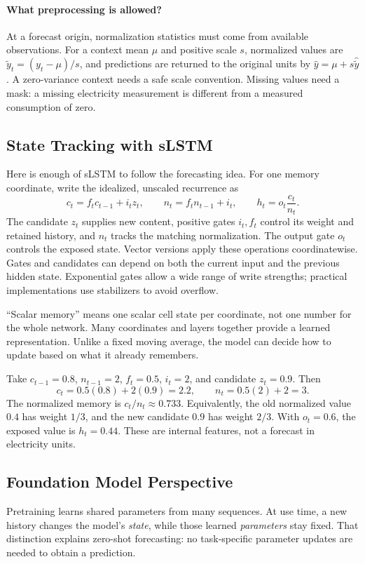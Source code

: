 \documentclass[11pt, oneside]{book}
\let\originalsubsection\subsection
\renewcommand{\subsection}{\Needspace{6\baselineskip}\originalsubsection}
\begin{document}
\paragraph{What preprocessing is allowed?} At a forecast origin, normalization statistics must come from available observations. For a context mean $\mu$ and positive scale $s$, normalized values are $\widetilde y_t=(y_t-\mu)/s$, and predictions are returned to the original units by $\widehat y=\mu+s\widehat{\widetilde y}$. A zero-variance context needs a safe scale convention. Missing values need a mask: a missing electricity measurement is different from a measured consumption of zero.

\subsection{State Tracking with sLSTM}\label{sec:source-9-1-3}
Here is enough of sLSTM to follow the forecasting idea. For one memory coordinate, write the idealized, unscaled recurrence as
\[
 c_t=f_tc_{t-1}+i_tz_t,\qquad
 n_t=f_tn_{t-1}+i_t,\qquad
 h_t=o_t\frac{c_t}{n_t}.
\]
The candidate $z_t$ supplies new content, positive gates $i_t,f_t$ control its weight and retained history, and $n_t$ tracks the matching normalization. The output gate $o_t$ controls the exposed state. Vector versions apply these operations coordinatewise. Gates and candidates can depend on both the current input and the previous hidden state. Exponential gates allow a wide range of write strengths; practical implementations use stabilizers to avoid overflow.

``Scalar memory'' means one scalar cell state per coordinate, not one number for the whole network. Many coordinates and layers together provide a learned representation. Unlike a fixed moving average, the model can decide how to update based on what it already remembers.

\begin{exbox}[title={A normalized memory update}]
Take $c_{t-1}=0.8$, $n_{t-1}=2$, $f_t=0.5$, $i_t=2$, and candidate $z_t=0.9$. Then
\[
 c_t=0.5(0.8)+2(0.9)=2.2,\qquad n_t=0.5(2)+2=3.
\]
The normalized memory is $c_t/n_t\approx0.733$. Equivalently, the old normalized value $0.4$ has weight $1/3$, and the new candidate $0.9$ has weight $2/3$. With $o_t=0.6$, the exposed value is $h_t=0.44$. These are internal features, not a forecast in electricity units.
\end{exbox}

\subsection{Foundation Model Perspective}\label{sec:source-9-1-4}
Pretraining learns shared parameters from many sequences. At use time, a new history changes the model's \emph{state}, while those learned \emph{parameters} stay fixed. That distinction explains zero-shot forecasting: no task-specific parameter updates are needed to obtain a prediction.
\end{document}
